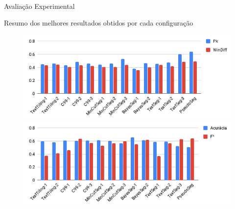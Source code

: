 \documentclass[xcolor=table]{beamer}
\begin{document}
\begin{frame}{Avaliação Experimental}

	\center Resumo dos melhores resultados obtidos por cada configuração
\begin{figure}[!ht] \centering     %

		\includegraphics[width=.82\textwidth]{images/graficos/resumo-wd-pk.png}	
		\label{fig:resumo-wd-pka}
		\includegraphics[width=.82\textwidth]{images/graficos/resumo-tradicionais.png}	
		\label{fig:resumo-tradicionaisa}
\end{figure}


\end{frame}
\end{document}
